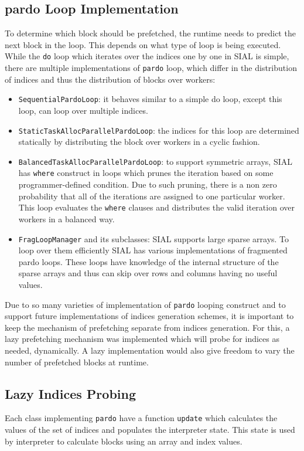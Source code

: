 \subsection{pardo Loop Implementation}
To determine which block should be prefetched, the runtime needs to predict
the next block in the loop. This depends on what type of loop is being executed.
While the \texttt{do} loop which iterates over the indices one by one in SIAL is
simple, there are multiple implementations of \texttt{pardo} loop, which differ
in the distribution of indices and thus the distribution of blocks over workers:
\begin{itemize}
\item \texttt{SequentialPardoLoop}: it behaves similar to a simple do loop,
  except this loop, can loop over multiple indices.
\item \texttt{StaticTaskAllocParallelPardoLoop}: the indices for this loop are
  determined statically by distributing the block over workers in a cyclic fashion.
\item \texttt{BalancedTaskAllocParallelPardoLoop}: to support symmetric arrays,
  SIAL has \texttt{where} construct in loops which prunes the iteration based on
  some programmer-defined condition. Due to such pruning, there is a non zero
  probability that all of the iterations are assigned to one particular worker.
  This loop evaluates the \texttt{where} clauses and distributes the valid iteration
  over workers in a balanced way.
\item \texttt{FragLoopManager} and its subclasses: SIAL supports large sparse
  arrays. To loop over them efficiently SIAL has various implementations of
  fragmented pardo loops. These loops have knowledge of the internal structure of the
  sparse arrays and thus can skip over rows and columns having no useful values.
\end{itemize}
Due to so many varieties of implementation of \texttt{pardo} looping construct
and to support future implementations of indices generation schemes, it is
important to keep the mechanism of prefetching separate from indices generation.
For this, a lazy prefetching mechanism was implemented which will probe for indices
as needed, dynamically. A lazy implementation would also give freedom to vary the number
of prefetched blocks at runtime.

\subsection{Lazy Indices Probing}
Each class implementing \texttt{pardo} have a function \texttt{update} which
calculates the values of the set of indices and populates the interpreter state. This
state is used by interpreter to calculate blocks using an array and index values.

